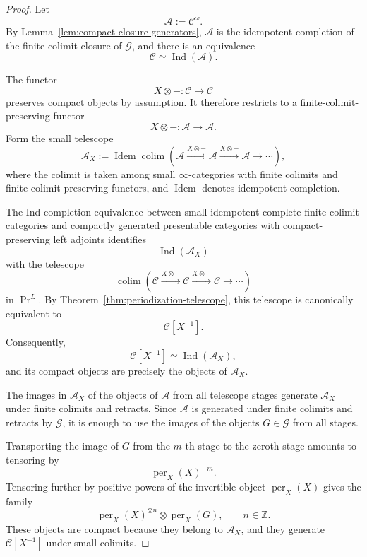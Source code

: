 \begin{proof}
Let
\[
    \mathcal A:=\mathcal C^\omega.
\]
By Lemma~\ref{lem:compact-closure-generators}, \(\mathcal A\) is the
idempotent completion of the finite-colimit closure of \(\mathcal G\), and
there is an equivalence
\[
    \mathcal C
    \simeq
    \operatorname{Ind}(\mathcal A).
\]

The functor
\[
    X\otimes-:
    \mathcal C
    \longrightarrow
    \mathcal C
\]
preserves compact objects by assumption.  It therefore restricts to a
finite-colimit-preserving functor
\[
    X\otimes-:
    \mathcal A
    \longrightarrow
    \mathcal A.
\]
Form the small telescope
\[
    \mathcal A_X
    :=
    \operatorname{Idem}
    \operatorname*{colim}
    \left(
      \mathcal A
      \xrightarrow{X\otimes-}
      \mathcal A
      \xrightarrow{X\otimes-}
      \mathcal A
      \longrightarrow\cdots
    \right),
\]
where the colimit is taken among small \(\infty\)-categories with finite
colimits and finite-colimit-preserving functors, and
\(\operatorname{Idem}\) denotes idempotent completion.

The Ind-completion equivalence between small idempotent-complete
finite-colimit categories and compactly generated presentable categories with
compact-preserving left adjoints identifies
\[
    \operatorname{Ind}(\mathcal A_X)
\]
with the telescope
\[
    \operatorname*{colim}
    \left(
      \mathcal C
      \xrightarrow{X\otimes-}
      \mathcal C
      \xrightarrow{X\otimes-}
      \mathcal C
      \longrightarrow\cdots
    \right)
\]
in \(\Pr^L\).  By
Theorem~\ref{thm:periodization-telescope}, this telescope is canonically
equivalent to
\[
    \mathcal C[X^{-1}].
\]
Consequently,
\[
    \mathcal C[X^{-1}]
    \simeq
    \operatorname{Ind}(\mathcal A_X),
\]
and its compact objects are precisely the objects of \(\mathcal A_X\).

The images in \(\mathcal A_X\) of the objects of \(\mathcal A\) from all
telescope stages generate \(\mathcal A_X\) under finite colimits and
retracts.  Since \(\mathcal A\) is generated under finite colimits and
retracts by \(\mathcal G\), it is enough to use the images of the objects
\(G\in\mathcal G\) from all stages.

Transporting the image of \(G\) from the \(m\)-th stage to the zeroth stage
amounts to tensoring by
\[
    \operatorname{per}_X(X)^{-m}.
\]
Tensoring further by positive powers of the invertible object
\(\operatorname{per}_X(X)\) gives the family
\[
    \operatorname{per}_X(X)^{\otimes n}
    \otimes
    \operatorname{per}_X(G),
    \qquad
    n\in\mathbb Z.
\]
These objects are compact because they belong to \(\mathcal A_X\), and they
generate \(\mathcal C[X^{-1}]\) under small colimits.
\end{proof}



